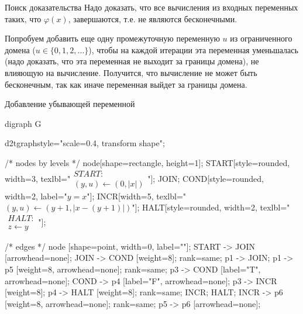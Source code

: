 \documentclass[hyperref={unicode=true}]{beamer}
\begin{document}
    
    \begin{frame}{Поиск доказательства}
    Надо доказать, что все вычисления из входных переменных таких, что $\varphi(x)$, завершаются, т.е. не являются бесконечными.

    Попробуем добавить еще одну промежуточную переменную $u$ из ограниченного домена ($u \in \{0,1,2,...\}$), чтобы на каждой итерации эта переменная уменьшалась (надо доказать, что эта переменная не выходит за границы домена), не влияющую на вычисление. Получится, что вычисление не может быть бесконечным, так как иначе переменная выйдет за границы домена.

    \end{frame}
   
  	\begin{frame}[fragile]{Добавление убывающей переменной}
	\huge
	\begin{dot2tex}[options=-traw]
	digraph G{
		d2tgraphstyle="scale=0.4, transform shape";
		
		/* nodes by levels */
		node[shape=rectangle, height=1];
		START[style=rounded, width=3, texlbl="$\begin{matrix}START:\\ (y, u) \leftarrow (0, |x|)\end{matrix}$"];
		JOIN;
        COND[style=rounded, width=2, label="$y = x$"];
		INCR[width=5, texlbl="$(y, u) \leftarrow (y + 1, |x - (y + 1)|)$"];
        HALT[style=rounded, width=2, texlbl="$\begin{matrix}HALT:\\  z \leftarrow y\end{matrix}$"];
				
		/* edges */
		node [shape=point, width=0, label=""];
		START -> JOIN [arrowhead=none]; JOIN -> COND [weight=8];
		{ rank=same; p1 -> JOIN; }
		p1 -> p5 [weight=8, arrowhead=none];
		{ rank=same; p3 -> COND [label="T", arrowhead=none]; COND -> p4 [label="F", arrowhead=none]; }
		p3 -> INCR [weight=8];
		p4 -> HALT [weight=8];
		{ rank=same; INCR; HALT; }
		INCR -> p6 [weight=8, arrowhead=none];
		{ rank=same; p5 -> p6 [arrowhead=none]; }
	}
	\end{dot2tex}
	\end{frame}
   
\end{document}

